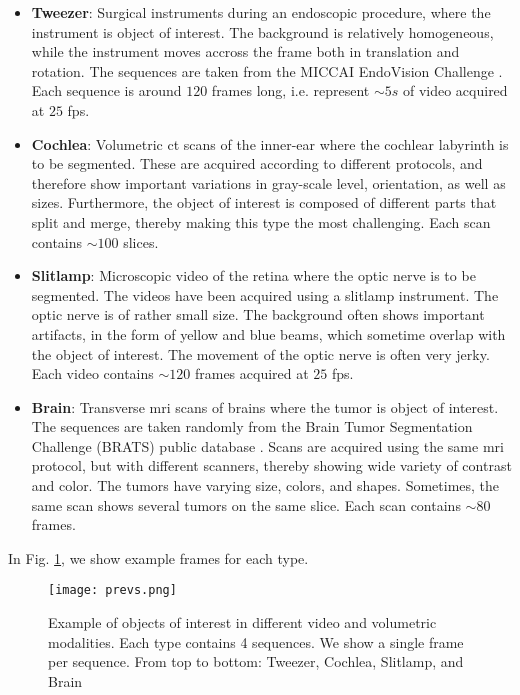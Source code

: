 \begin{itemize}
  \item \textbf{Tweezer}: Surgical instruments during an endoscopic procedure, where the instrument is object of interest.
    The background is relatively homogeneous, while the instrument moves accross the frame both in translation and rotation.
    The sequences are taken from the MICCAI EndoVision Challenge \cite{EndoChall}.
    Each sequence is around $120$ frames long, i.e. represent $\sim 5s$ of video acquired at $25$ fps.
  \item \textbf{Cochlea}: Volumetric \Gls{ct} scans of the inner-ear where the cochlear labyrinth is to be segmented. These are acquired according to different protocols, and therefore show important variations in gray-scale level, orientation, as well as sizes. Furthermore, the object of interest is composed of different parts that split and merge, thereby making this type the most challenging.
    Each scan contains $\sim 100$ slices.
  \item \textbf{Slitlamp}: Microscopic video of the retina where the optic nerve is to be segmented. The videos have been acquired using a slitlamp instrument.
    The optic nerve is of rather small size. The background often shows important artifacts, in the form of yellow and blue beams, which sometime overlap with the object of interest. The movement of the optic nerve is often very jerky.
    Each video contains $\sim 120$ frames acquired at $25$ fps.
  \item \textbf{Brain}: Transverse \gls{mri} scans of brains where the tumor is object of interest. The sequences are taken randomly from the Brain Tumor Segmentation Challenge (BRATS) public database \cite{BRATSChall}.
    Scans are acquired using the same \gls{mri} protocol, but with different scanners, thereby showing wide variety of contrast and color.
    The tumors have varying size, colors, and shapes. Sometimes, the same scan shows several tumors on the same slice.
    Each scan contains $\sim 80$ frames.
\end{itemize}

In Fig. \ref{fig:dset_previews}, we show example frames for each type.

\begin{figure}
\centering
\texttt{[image: prevs.png]}
\caption{Example of objects of interest in different video and volumetric modalities. Each type contains 4 sequences. We show a single frame per sequence.
  From top to bottom: Tweezer, Cochlea, Slitlamp, and Brain}
\label{fig:dset_previews}
\end{figure}


